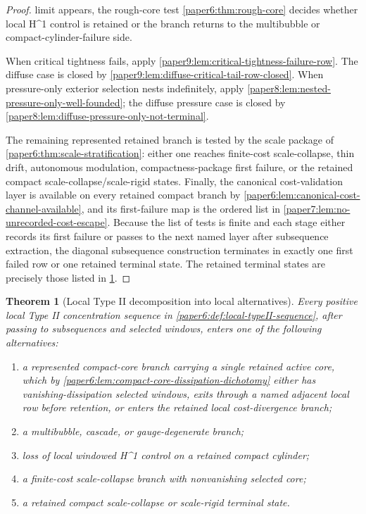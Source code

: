 \documentclass[11pt]{amsart}
\def\({}%
\def\){}%
\theoremstyle{plain}
\newtheorem{theorem}{Theorem}[section]
\theoremstyle{definition}
\theoremstyle{remark}
\begin{document}
\begin{proof}
limit appears, the rough-core test \cref{paper6:thm:rough-core} decides whether
local \(H^1\) control is retained or the branch returns to the multibubble or
compact-cylinder-failure side.
\par
When critical tightness fails, apply
\cref{paper9:lem:critical-tightness-failure-row}.  The diffuse case is closed
by \cref{paper9:lem:diffuse-critical-tail-row-closed}.  When pressure-only
exterior selection nests indefinitely, apply
\cref{paper8:lem:nested-pressure-only-well-founded}; the diffuse pressure case
is closed by \cref{paper8:lem:diffuse-pressure-only-not-terminal}.
\par
The remaining represented retained branch is tested by the scale package of
\cref{paper6:thm:scale-stratification}: either one reaches finite-cost
scale-collapse, thin drift, autonomous modulation, compactness-package first
failure, or the retained compact scale-collapse/scale-rigid states.  Finally,
the canonical cost-validation layer is available on every retained compact
branch by \cref{paper6:lem:canonical-cost-channel-available}, and its first-failure map
is the ordered list in \cref{paper7:lem:no-unrecorded-cost-escape}.  Because
the list of tests is finite and each stage either records its first failure or
passes to the next named layer after subsequence extraction, the diagonal
subsequence construction terminates in exactly one first failed row or one
retained terminal state.  The retained terminal states are precisely those
listed in \cref{paper6:thm:state-decomposition}.
\end{proof}

\begin{theorem}[Local Type II decomposition into local alternatives]
\label{paper6:thm:state-decomposition}
Every positive local Type II concentration sequence in \cref{paper6:def:local-typeII-sequence}, after passing to subsequences and selected windows, enters one of the following alternatives:
\begin{enumerate}[label=\textup{(\roman*)}]
\item a represented compact-core branch carrying a single retained active core,
which by
\cref{paper6:lem:compact-core-dissipation-dichotomy} either has
vanishing-dissipation selected windows, exits through a named adjacent local
row before retention, or enters the retained local cost-divergence branch;
\item a multibubble, cascade, or gauge-degenerate branch;
\item loss of local windowed \(H^1\) control on a retained compact cylinder;
\item a finite-cost scale-collapse branch with nonvanishing selected core;
\item a retained compact scale-collapse or scale-rigid terminal state.
\end{enumerate}
\end{theorem}
\end{document}
